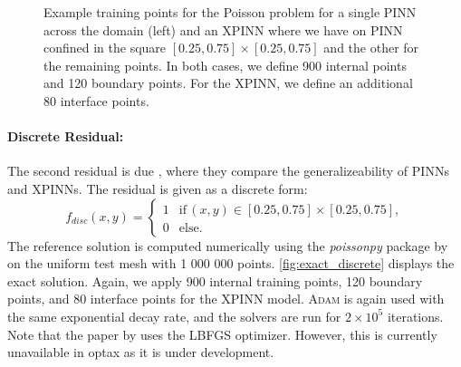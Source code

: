 \begin{figure}[t]
    \hfill
    \caption{Example training points for the Poisson problem for a single PINN across the domain (left) and an XPINN where we have on PINN confined in the square $[0.25, 0.75]\times [0.25, 0.75]$ and the other for the remaining points. In both cases, we define 900 internal points and 120 boundary points. For the XPINN, we define an additional 80 interface points.}
    \label{fig:decomp_poisson}
\end{figure}

\paragraph{Discrete Residual:}
The second residual is due \cite{XPINN_generalize}, where they compare the generalizeability of PINNs and XPINNs. The residual is given as a discrete form:
\begin{equation*}
    f_{disc}(x,y)=
    \begin{cases}
        1 &\text{if} \, (x,y)\in [0.25,0.75]\times[0.25,0.75], \\
        0 &\text{else}.
        \label{eq:discrete_poisson}
    \end{cases}
\end{equation*}
The reference solution is computed numerically using the \textit{poissonpy} package by \cite{poissonpy} on the uniform test mesh with 1 000 000 points. \autoref{fig:exact_discrete} displays the exact solution. Again, we apply 900 internal training points, 120 boundary points, and 80 interface points for the XPINN model. \textsc{Adam} is again used with the same exponential decay rate, and the solvers are run for $2\times 10^5$ iterations. Note that the paper by \textcite{XPINN_generalize} uses the LBFGS optimizer. However, this is currently unavailable in optax as it is under development.

